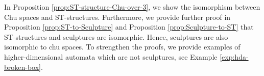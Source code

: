         In Proposition \ref{prop:ST-structure-Chu-over-3}, we show the isomorphism between Chu spaces and ST-structures. Furthermore, we provide further proof in Proposition \ref{prop:ST-to-Sculpture} and Proposition \ref{prop:Sculpture-to-ST} that ST-structures and sculptures are isomorphic. Hence, sculptures are also isomorphic to chu spaces. To strengthen the proofs, we provide examples of higher-dimensional automata which are not sculptures, see Example \ref{exp:hda-broken-box}.
        